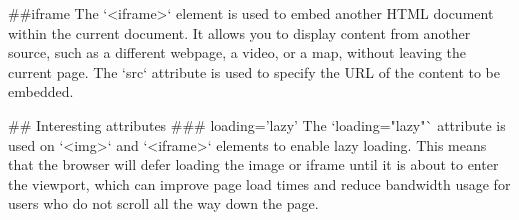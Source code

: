 ##iframe
The `<iframe>` element is used to embed another HTML document within the current document. 
It allows you to display content from another source, such as a different webpage, a video, or a map, without leaving the current page. The `src` attribute is used to specify the URL of the content to be embedded.

## Interesting attributes
### loading='lazy'
The `loading="lazy"` attribute is used on `<img>` and `<iframe>` elements to enable lazy loading. 
This means that the browser will defer loading the image or iframe until it is about to enter the viewport, which can improve page load times and reduce bandwidth usage for users who do not scroll all the way down the page.